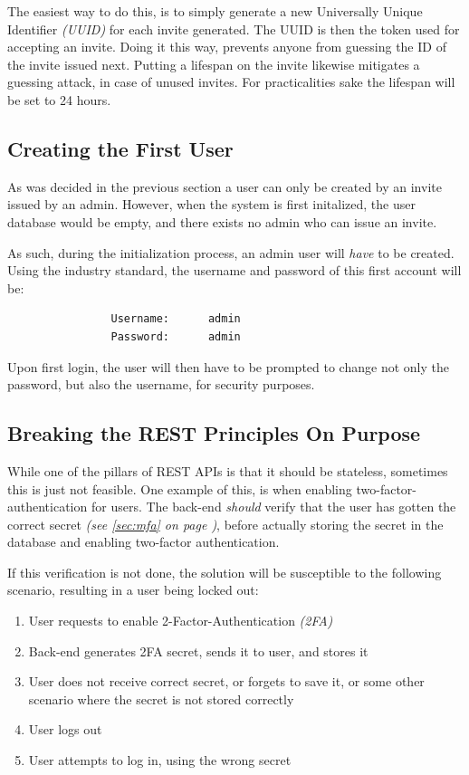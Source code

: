 			The easiest way to do this, is to simply generate a new Universally Unique Identifier \emph{(UUID)} for each invite generated. The UUID is then the token used for accepting an invite. Doing it this way, prevents anyone from guessing the ID of the invite issued next. Putting a lifespan on the invite likewise mitigates a guessing attack, in case of unused invites. For practicalities sake the lifespan will be set to 24 hours.

		\subsection{Creating the First User}
			As was decided in the previous section a user can only be created by an invite issued by an admin. However, when the system is first initalized, the user database would be empty, and there exists no admin who can issue an invite.

			As such, during the initialization process, an admin user will \emph{have} to be created. Using the industry standard, the username and password of this first account will be:
			\begin{verbatim}
				Username:      admin
				Password:      admin
			\end{verbatim}
			Upon first login, the user will then have to be prompted to change not only the password, but also the username, for security purposes.

		\subsection{Breaking the REST Principles On Purpose}
			While one of the pillars of REST APIs is that it should be stateless, sometimes this is just not feasible. One example of this, is when enabling two-factor-authentication for users. The back-end \emph{should} verify that the user has gotten the correct secret \emph{(see \ref{sec:mfa} on page \pageref{sec:mfa})}, before actually storing the secret in the database and enabling two-factor authentication. 

			If this verification is not done, the solution will be susceptible to the following scenario, resulting in a user being locked out:
			\begin{enumerate}
				\item User requests to enable 2-Factor-Authentication \emph{(2FA)}
				\item Back-end generates 2FA secret, sends it to user, and stores it
				\item User does not receive correct secret, or forgets to save it, or some other scenario where the secret is not stored correctly
				\item User logs out
				\item User attempts to log in, using the wrong secret
			\end{enumerate}

